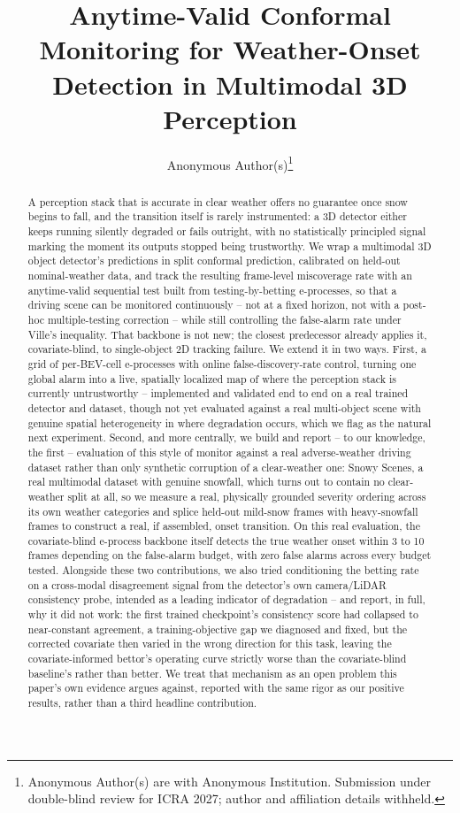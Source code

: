 \documentclass[letterpaper, 10pt, conference]{ieeeconf}
\title{\LARGE \bf
Anytime-Valid Conformal Monitoring for Weather-Onset Detection in Multimodal 3D Perception
}
\author{Anonymous Author(s)\thanks{Anonymous Author(s) are with Anonymous Institution. Submission under double-blind review for ICRA 2027; author and affiliation details withheld.}}
\theoremstyle{plain}
\begin{document}
\maketitle
\thispagestyle{empty}
\pagestyle{empty}

\begin{abstract}
A perception stack that is accurate in clear weather offers no guarantee once snow begins to fall, and the transition itself is rarely instrumented: a 3D detector either keeps running silently degraded or fails outright, with no statistically principled signal marking the moment its outputs stopped being trustworthy. We wrap a multimodal 3D object detector's predictions in split conformal prediction, calibrated on held-out nominal-weather data, and track the resulting frame-level miscoverage rate with an anytime-valid sequential test built from testing-by-betting e-processes, so that a driving scene can be monitored continuously -- not at a fixed horizon, not with a post-hoc multiple-testing correction -- while still controlling the false-alarm rate under Ville's inequality. That backbone is not new; the closest predecessor already applies it, covariate-blind, to single-object 2D tracking failure. We extend it in two ways. First, a grid of per-BEV-cell e-processes with online false-discovery-rate control, turning one global alarm into a live, spatially localized map of where the perception stack is currently untrustworthy -- implemented and validated end to end on a real trained detector and dataset, though not yet evaluated against a real multi-object scene with genuine spatial heterogeneity in where degradation occurs, which we flag as the natural next experiment. Second, and more centrally, we build and report -- to our knowledge, the first -- evaluation of this style of monitor against a real adverse-weather driving dataset rather than only synthetic corruption of a clear-weather one: Snowy Scenes, a real multimodal dataset with genuine snowfall, which turns out to contain no clear-weather split at all, so we measure a real, physically grounded severity ordering across its own weather categories and splice held-out mild-snow frames with heavy-snowfall frames to construct a real, if assembled, onset transition. On this real evaluation, the covariate-blind e-process backbone itself detects the true weather onset within 3 to 10 frames depending on the false-alarm budget, with zero false alarms across every budget tested. Alongside these two contributions, we also tried conditioning the betting rate on a cross-modal disagreement signal from the detector's own camera/LiDAR consistency probe, intended as a leading indicator of degradation -- and report, in full, why it did not work: the first trained checkpoint's consistency score had collapsed to near-constant agreement, a training-objective gap we diagnosed and fixed, but the corrected covariate then varied in the wrong direction for this task, leaving the covariate-informed bettor's operating curve strictly worse than the covariate-blind baseline's rather than better. We treat that mechanism as an open problem this paper's own evidence argues against, reported with the same rigor as our positive results, rather than a third headline contribution.

\end{abstract}




\FloatBarrier





\end{document}
